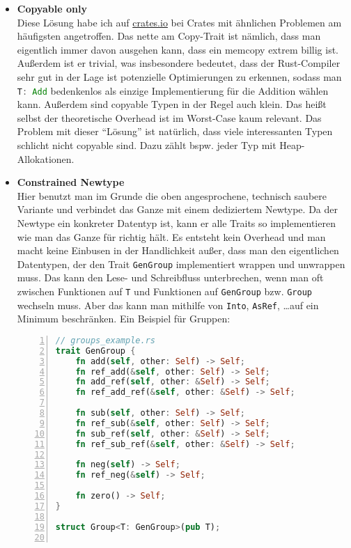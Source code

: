 \documentclass[12pt]{article}
\begin{document}
\begin{itemize}
\item \textbf{Copyable only}\\
Diese Lösung habe ich auf \href{https://crates.io}{crates.io} bei Crates mit ähnlichen Problemen am häufigsten angetroffen. Das nette am Copy-Trait ist nämlich, dass man eigentlich immer davon ausgehen kann, dass ein memcopy extrem billig ist. Außerdem ist er trivial, was insbesondere bedeutet, dass der Rust-Compiler sehr gut in der Lage ist potenzielle Optimierungen zu erkennen, sodass man \lstinline[language=Rust, morekeywords={T}]|T: Add| bedenkenlos als einzige Implementierung für die Addition wählen kann. Außerdem sind copyable Typen in der Regel auch klein. Das heißt selbst der theoretische Overhead ist im Worst-Case kaum relevant. Das Problem mit dieser ``Lösung'' ist natürlich, dass viele interessanten Typen schlicht nicht copyable sind. Dazu zählt bspw. jeder Typ mit Heap-Allokationen.
\item \textbf{Constrained Newtype}\\
Hier benutzt man im Grunde die oben angesprochene, technisch saubere Variante und verbindet das Ganze mit einem dediziertem Newtype. Da der Newtype ein konkreter Datentyp ist, kann er alle Traits so implementieren wie man das Ganze für richtig hält. Es entsteht kein Overhead und man macht keine Einbusen in der Handlichkeit außer, dass man den eigentlichen Datentypen, der den Trait \texttt{GenGroup} implementiert wrappen und unwrappen muss. Das kann den Lese- und Schreibfluss unterbrechen, wenn man oft zwischen Funktionen auf \texttt{T} und Funktionen auf \texttt{GenGroup} bzw. \texttt{Group} wechseln muss. Aber das kann man mithilfe von \texttt{Into}, \texttt{AsRef}, \dots auf ein Minimum beschränken. Ein Beispiel für Gruppen:
\begin{lstlisting}[language=Rust, numbers=left, morekeywords={GenGroup, Group, T}]
// groups_example.rs
trait GenGroup {
	fn add(self, other: Self) -> Self;
	fn ref_add(&self, other: Self) -> Self;
	fn add_ref(self, other: &Self) -> Self;
	fn ref_add_ref(&self, other: &Self) -> Self;
	
	fn sub(self, other: Self) -> Self;
	fn ref_sub(&self, other: Self) -> Self;
	fn sub_ref(self, other: &Self) -> Self;
	fn ref_sub_ref(&self, other: &Self) -> Self;
	
	fn neg(self) -> Self;
	fn ref_neg(&self) -> Self;
	
	fn zero() -> Self;
}

struct Group<T: GenGroup>(pub T);


\end{lstlisting}
\end{itemize}
\end{document}
